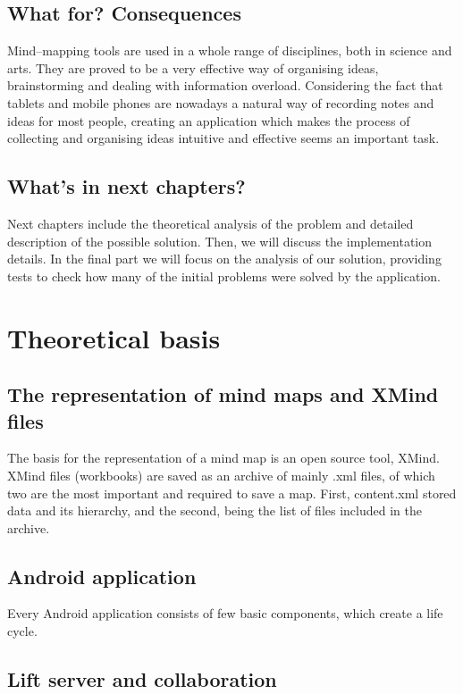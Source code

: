 \documentclass[american]{bsc}
\begin{document}
\section{What for? Consequences}
\label{sec:whatfor}
Mind--mapping tools are used in a whole range of disciplines, both in science and arts. They are proved to be a very effective way of organising ideas, brainstorming and dealing with information overload. Considering the fact that tablets and mobile phones are nowadays a natural way of recording notes and ideas for most people, creating an application which makes the process of collecting and organising ideas intuitive and effective seems an important task.

\section{What's in next chapters?}
\label{sec:nextchapters}
Next chapters include the theoretical analysis of the problem and detailed description of the possible solution. Then, we will discuss the implementation details. In the final part we will focus on the analysis of our solution, providing tests to check how many of the initial problems were solved by the application.

\chapter{Theoretical basis}
\label{chap:theory}

\section{The representation of mind maps and XMind files}
\label{sec:xmind}
The basis for the representation of a mind map is an open source tool, XMind. 
XMind files (workbooks) are saved as an archive of mainly .xml files, of which two are the most important and required to save a map. First, content.xml stored data and its hierarchy, and the second,  being the list of files included in the archive. 

\section{Android application}
\label{androidsdk}
Every Android application consists of few basic components, which create a life cycle. 

\section{Lift server and collaboration}
\label{lift}
\end{document}
